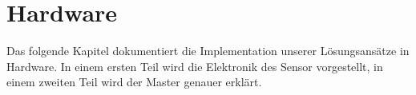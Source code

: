 \chapter{Hardware}
\label{chap:hardware}


Das    folgende    Kapitel    dokumentiert    die    Implementation    unserer
L\"osungsans\"atze in Hardware. In  einem ersten Teil wird  die Elektronik des
Sensor vorgestellt, in einem zweiten Teil wird der Master genauer erkl\"art.
